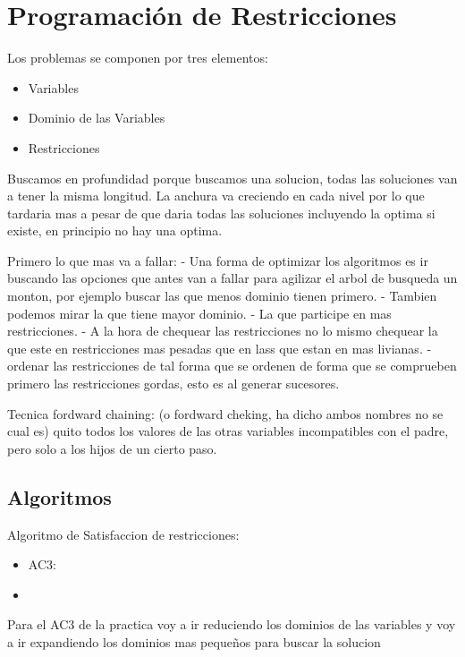 \chapter{Programación de Restricciones}

Los problemas se componen por tres elementos:
\begin{itemize}
    \item Variables
    \item Dominio de las Variables
    \item Restricciones
\end{itemize}

Buscamos en profundidad porque buscamos una solucion, todas las soluciones van a tener la misma longitud. 
La anchura va creciendo en cada nivel por lo que tardaria mas a pesar de que daria todas las soluciones incluyendo la optima si existe, en principio no hay una optima.

Primero lo que mas va a fallar:
- Una forma de optimizar los algoritmos es ir buscando las opciones que antes van a fallar para agilizar el arbol de busqueda un monton, por ejemplo buscar las que menos dominio tienen primero.
- Tambien podemos mirar la que tiene mayor dominio.
- La que participe en mas restricciones.
- A la hora de chequear las restricciones no lo mismo chequear la que este en restricciones mas pesadas que en lass que estan en mas livianas.
- ordenar las restricciones  de tal forma que se ordenen de forma que se comprueben primero las restricciones gordas, esto es al generar sucesores.

Tecnica fordward chaining: (o fordward cheking, ha dicho ambos nombres no se cual es) quito todos los valores de las otras variables incompatibles con el padre, pero solo a los hijos de un cierto paso.



\section{Algoritmos}

Algoritmo de Satisfaccion de restricciones: 
\begin{itemize}
    \item AC3:
    \item 
\end{itemize}

Para el AC3 de la practica voy a ir reduciendo los dominios de las variables y voy a ir expandiendo  los dominios mas pequeños para buscar la solucion

